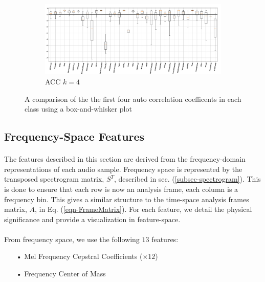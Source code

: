 \documentclass[12pt,letterpaper]{article}
\begin{document}
\begin{figure}[H]
\begin{center}
	\begin{subfigure}{1.0\textwidth}
	\centering
	\includegraphics[width=\textwidth , height=0.2\textheight]
		{../FiguresFeatures/ACC_4}
	\caption{ACC $k=4$}
	\end{subfigure}	
	
\end{center}
\caption{A comparison of the the first four auto correlation coefficents in each class using a box-and-whisker plot}
\label{fig-FeatureACC}
\end{figure}


\newpage

\subsection{Frequency-Space Features}
\label{subsec-FreqFeatures}

\paragraph*{}The features described in this section are derived from the frequency-domain representations of each audio sample. Frequency space is represented by the transposed spectrogram matrix, $S^T$, described in sec. (\ref{subsec-spectrogram}). This is done to ensure that each  row is now an analysis frame, each column is a frequency bin. This gives a similar structure to the time-space analysis frames matrix, $A$, in Eq. (\ref{eqn-FrameMatrix}).
For each feature, we detail the physical significance and provide a visualization in feature-space.

\paragraph*{}From frequency space, we use the following $13$ features:
\begin{itemize}
\item[•] Mel Frequency Cepstral Coefficients ($\times 12$)
\item[•] Frequency Center of Mass
\end{itemize}
\end{document}
